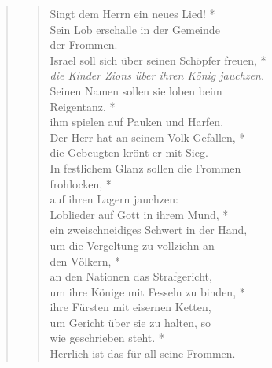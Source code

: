 \begin{quote}
\end{quote}

\vspace{0.3cm}

\def\greinitialformat#1{{\fontsize{40}{40}\selectfont #1}}
\gresetfirstlineaboveinitial{\small \textcolor{red}{Ps 149}}{}
\setaboveinitialseparation{0.72mm}



\vspace{0.3cm}


\begin{quote}

\begin{verse}
 Singt dem Herrn ein neues Lied! *\\
Sein Lob erschalle in der Gemeinde \\der Frommen. \\
\vin Israel soll sich über seinen Schöpfer freuen, *\\
\vin \textit{die Kinder Zions über ihren König jauchzen.} \\
Seinen Namen sollen sie loben beim\\ Reigentanz, *\\
ihm spielen auf Pauken und Harfen. \\
\vin Der Herr hat an seinem Volk Gefallen, *\\
\vin die Gebeugten krönt er mit Sieg. \\
In festlichem Glanz sollen die Frommen \\frohlocken, *\\
auf ihren Lagern jauchzen:\\
\vin Loblieder auf Gott in ihrem Mund, *\\
\vin ein zweischneidiges Schwert in der Hand, \\
um die Vergeltung zu vollziehn an \\den Völkern, *\\
an den Nationen das Strafgericht,\\
\vin um ihre Könige mit Fesseln zu binden, *\\
\vin ihre Fürsten mit eisernen Ketten,\\
um Gericht über sie zu halten, so\\ wie geschrieben steht. *\\
Herrlich ist das für all seine Frommen. \\
\end{verse}

\end{quote}


